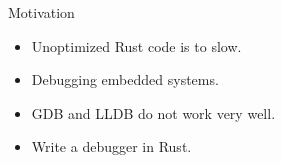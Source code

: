 


\begin{frame}{Motivation}
    \begin{itemize}
        \item Unoptimized Rust code is to slow.
        \item Debugging embedded systems.
        \item GDB and LLDB do not work very well.
        \item Write a debugger in Rust.
    \end{itemize}
\end{frame}




